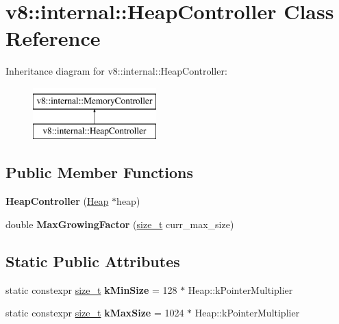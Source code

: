 \hypertarget{classv8_1_1internal_1_1HeapController}{}\section{v8\+:\+:internal\+:\+:Heap\+Controller Class Reference}
\label{classv8_1_1internal_1_1HeapController}
Inheritance diagram for v8\+:\+:internal\+:\+:Heap\+Controller\+:\begin{figure}[H]
\begin{center}
\leavevmode
\includegraphics[height=2.000000cm]{classv8_1_1internal_1_1HeapController}
\end{center}
\end{figure}
\subsection*{Public Member Functions}
\begin{DoxyCompactItemize}
\item 
\mbox{\label{classv8_1_1internal_1_1HeapController_a87615f2f63eb26264b7b868d41d6077f}} 
{\bfseries Heap\+Controller} (\mbox{\hyperlink{classv8_1_1internal_1_1Heap}{Heap}} $\ast$heap)
\item 
\mbox{\label{classv8_1_1internal_1_1HeapController_a2231cf461a5f155da5344c157a1a0881}} 
double {\bfseries Max\+Growing\+Factor} (\mbox{\hyperlink{classsize__t}{size\+\_\+t}} curr\+\_\+max\+\_\+size)
\end{DoxyCompactItemize}
\subsection*{Static Public Attributes}
\begin{DoxyCompactItemize}
\item 
\mbox{\label{classv8_1_1internal_1_1HeapController_a337040f63e4159e94a65e8c523b86fd1}} 
static constexpr \mbox{\hyperlink{classsize__t}{size\+\_\+t}} {\bfseries k\+Min\+Size} = 128 $\ast$ Heap\+::k\+Pointer\+Multiplier
\item 
\mbox{\label{classv8_1_1internal_1_1HeapController_ac90db9f56191ba8faa4a1542ae921b13}} 
static constexpr \mbox{\hyperlink{classsize__t}{size\+\_\+t}} {\bfseries k\+Max\+Size} = 1024 $\ast$ Heap\+::k\+Pointer\+Multiplier
\end{DoxyCompactItemize}
